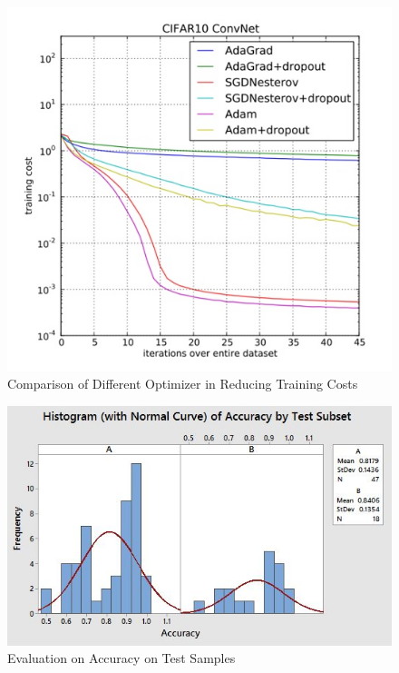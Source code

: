 \documentclass[twoside,11pt]{article}
\begin{document}
\begin{figure}[htbp]
\centering
\includegraphics[width=.8\textwidth]{figure3.jpg}
\caption{Comparison of Different Optimizer in Reducing Training Costs}
\label{figure1}
\end{figure}


\begin{figure}[htbp]
\centering
\includegraphics[width=.8\textwidth]{figure9.JPG}
\caption{Evaluation on Accuracy on Test Samples}
\label{figure1}
\end{figure}
\end{document}
